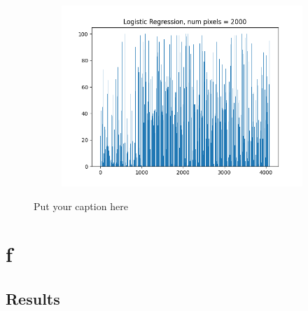 \documentclass{article}
\begin{document}
\begin{figure}[H]
\begin{subfigure}{.33\textwidth}
  \label{fig:sub-second}
\end{subfigure}
\begin{subfigure}{.33\textwidth}
  \centering
  \includegraphics[width=1\linewidth]{2e/Logistic Regression, 2000.png}  
  
  \label{fig:sub-second}
\end{subfigure}
\caption{Put your caption here}
\label{feet histo 2e}
\end{figure}
\newpage
\section{f}
\subsection{Results}
\end{document}
